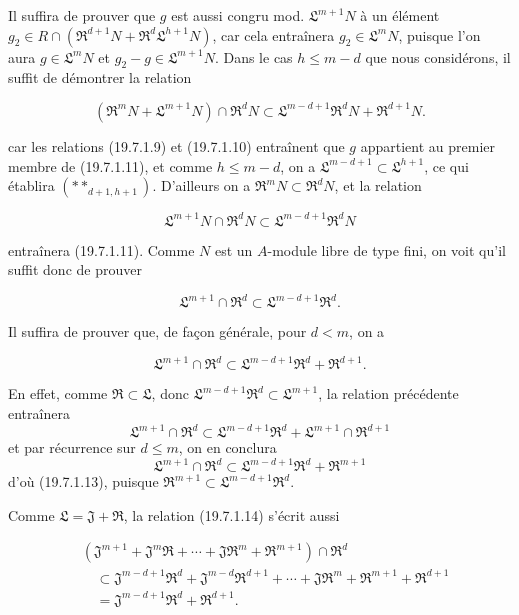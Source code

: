 Il suffira de prouver que $g$ est aussi congru mod. $\mathfrak L^{m+1}N$ à un élément $g_2\in R\cap(\mathfrak R^{d+1}N+\mathfrak R^d\mathfrak L^{h+1}N)$, car cela entraînera $g_2\in\mathfrak L^mN$, puisque l'on aura $g\in\mathfrak L^mN$ et $g_2-g\in\mathfrak L^{m+1}N$. Dans le cas $h\leq m-d$ que nous considérons, il suffit de démontrer la relation
\begin{env}[19.7.1.11]
\label{IV.19.7.1.11}
\[
  (\mathfrak R^mN+\mathfrak L^{m+1}N)\cap\mathfrak R^dN\subset\mathfrak L^{m-d+1}\mathfrak R^dN+\mathfrak R^{d+1}N.
\]
\end{env}


car les relations (19.7.1.9) et (19.7.1.10) entraînent que $g$ appartient au premier membre de (19.7.1.11), et comme $h\leq m-d$, on a $\mathfrak L^{m-d+1}\subset\mathfrak L^{h+1}$, ce qui établira $(**_{d+1,h+1})$. D'ailleurs on a $\mathfrak R^mN\subset\mathfrak R^dN$, et la relation
\begin{env}[19.7.1.12]
\label{IV.19.7.1.12}
\[
  \mathfrak L^{m+1}N\cap\mathfrak R^dN\subset\mathfrak L^{m-d+1}\mathfrak R^dN
\]
\end{env}
entraînera (19.7.1.11). Comme $N$ est un $A$-module libre de type fini, on voit qu'il suffit donc de prouver
\begin{env}[19.7.1.13]
\label{IV.19.7.1.13}
\[
  \mathfrak L^{m+1}\cap\mathfrak R^d\subset\mathfrak L^{m-d+1}\mathfrak R^d.
\]
\end{env}

Il suffira de prouver que, de façon générale, pour $d<m$, on a
\begin{env}[19.7.1.14]
\label{IV.19.7.1.14}
\[
  \mathfrak L^{m+1}\cap\mathfrak R^d\subset\mathfrak L^{m-d+1}\mathfrak R^d+\mathfrak R^{d+1}.
\]
\end{env}
En effet, comme $\mathfrak R\subset\mathfrak L$, donc $\mathfrak L^{m-d+1}\mathfrak R^d\subset\mathfrak L^{m+1}$, la relation précédente entraînera
\[
  \mathfrak L^{m+1}\cap\mathfrak R^d\subset\mathfrak L^{m-d+1}\mathfrak R^d+\mathfrak L^{m+1}\cap\mathfrak R^{d+1}
\]
et par récurrence sur $d\leq m$, on en conclura
\[
  \mathfrak L^{m+1}\cap\mathfrak R^d\subset\mathfrak L^{m-d+1}\mathfrak R^d+\mathfrak R^{m+1}
\]
d'où (19.7.1.13), puisque $\mathfrak R^{m+1}\subset\mathfrak L^{m-d+1}\mathfrak R^d$.

Comme $\mathfrak L=\mathfrak J+\mathfrak R$, la relation (19.7.1.14) s'écrit aussi
\begin{env}[19.7.1.15]
\label{IV.19.7.1.15}
\[
\begin{aligned}
  &(\mathfrak J^{m+1}+\mathfrak J^m\mathfrak R+\cdots+\mathfrak J\mathfrak R^m+\mathfrak R^{m+1})\cap\mathfrak R^d\\
  &\quad\subset\mathfrak J^{m-d+1}\mathfrak R^d+\mathfrak J^{m-d}\mathfrak R^{d+1}+\cdots+\mathfrak J\mathfrak R^m+\mathfrak R^{m+1}+\mathfrak R^{d+1}\\
  &\quad=\mathfrak J^{m-d+1}\mathfrak R^d+\mathfrak R^{d+1}.
\end{aligned}
\]
\end{env}

